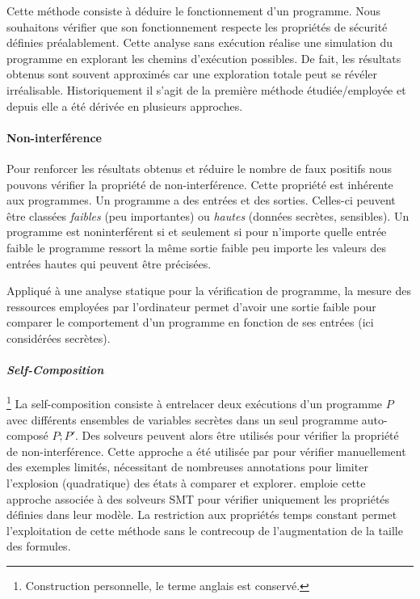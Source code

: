 Cette méthode consiste à déduire le fonctionnement d'un programme. Nous souhaitons vérifier que son fonctionnement respecte les propriétés de sécurité définies préalablement. Cette analyse sans exécution réalise une simulation du programme en explorant les chemins d'exécution possibles. De fait, les résultats obtenus sont souvent approximés car une exploration totale peut se révéler irréalisable. Historiquement il s'agit de la première méthode étudiée/employée et depuis elle a été dérivée en plusieurs approches.\medbreak

\paragraph{Non-interférence} Pour renforcer les résultats obtenus et réduire le nombre de faux positifs nous pouvons vérifier la propriété de non-interférence. Cette propriété est inhérente aux programmes. Un programme a des entrées et des sorties. Celles-ci peuvent être classées \textit{faibles} (peu importantes) ou \textit{hautes} (données secrètes, sensibles). Un programme est noninterférent si et seulement si pour n'importe quelle entrée faible le programme ressort la même sortie faible peu importe les valeurs des entrées hautes qui peuvent être précisées.

Appliqué à une analyse statique pour la vérification de programme, la mesure des ressources employées par l'ordinateur permet d'avoir une sortie faible pour comparer le comportement d'un programme en fonction de ses entrées (ici considérées secrètes).

\paragraph{\textit{Self-Composition}}\footnote{Construction personnelle, le terme anglais est conservé.} La self-composition consiste à entrelacer deux exécutions d'un programme $P$ avec différents ensembles de variables secrètes dans un seul programme auto-composé $P;P'$. Des solveurs peuvent alors être utilisés pour vérifier la propriété de non-interférence. Cette approche a été utilisée par \citeauthor{ABPV13} \cite{ABPV13} pour vérifier manuellement des exemples limités, nécessitant de nombreuses annotations pour limiter l'explosion (quadratique) des états à comparer et explorer. \cite{binsecRel2019} emploie cette approche associée à des solveurs SMT pour vérifier uniquement les propriétés définies dans leur modèle. La restriction aux propriétés temps constant permet l'exploitation de cette méthode sans le contrecoup de l'augmentation de la taille des formules.

